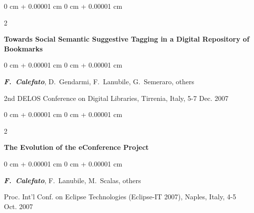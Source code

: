 \documentclass[10pt, a4paper]{article}
\newenvironment{onecolentry}{
    \begin{adjustwidth}{
        0 cm + 0.00001 cm
    }{
        0 cm + 0.00001 cm
    }
}{
    \end{adjustwidth}
} %
\newenvironment{twocolentry}[2][]{
    \onecolentry
    \def\secondColumn{#2}
    \setcolumnwidth{\fill, 4.5 cm}
    \begin{paracol}{2}
}{
    \switchcolumn \raggedleft \secondColumn
    \end{paracol}
    \endonecolentry
} %
\begin{document}
        \begin{samepage}
            \begin{twocolentry}{
                2007
            }
                \textbf{Towards Social Semantic Suggestive Tagging in a Digital Repository of Bookmarks}
            \end{twocolentry}

            \vspace{0.10 cm}
            
            \begin{onecolentry}
                \mbox{\textbf{\textit{F. Calefato}}}, \mbox{D. Gendarmi}, \mbox{F. Lanubile}, \mbox{G. Semeraro}, \mbox{others}

                \vspace{0.10 cm}
                
        2nd DELOS Conference on Digital Libraries, Tirrenia, Italy, 5-7 Dec. 2007\end{onecolentry}
        \end{samepage}

        \vspace{0.2 cm}

        \begin{samepage}
            \begin{twocolentry}{
                2007
            }
                \textbf{The Evolution of the eConference Project}
            \end{twocolentry}

            \vspace{0.10 cm}
            
            \begin{onecolentry}
                \mbox{\textbf{\textit{F. Calefato}}}, \mbox{F. Lanubile}, \mbox{M. Scalas}, \mbox{others}

                \vspace{0.10 cm}
                
        Proc. Int'l Conf. on Eclipse Technologies (Eclipse-IT 2007), Naples, Italy, 4-5 Oct. 2007\end{onecolentry}
        \end{samepage}

        \vspace{0.2 cm}
\end{document}
